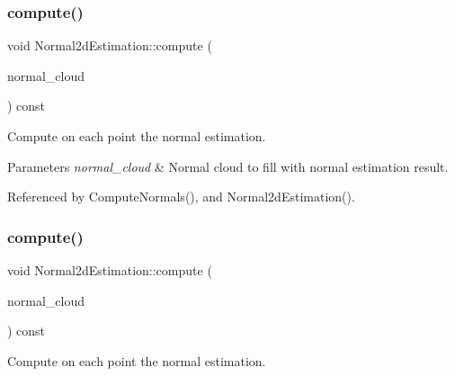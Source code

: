 \mbox{\label{classNormal2dEstimation_a908d3a85cda5b29bb3ef119ab30d6ab6}} 
\subsubsection{\texorpdfstring{compute()}{compute()}\hspace{0.1cm}{\footnotesize\ttfamily [2/4]}}
{\footnotesize\ttfamily void Normal2d\+Estimation\+::compute (\begin{DoxyParamCaption}\item[{const \hyperlink{Normal2dEstimation_8h_a2894055ff89c63cbae90e22dfddaa610}{Ptr\+Cloud} \&}]{normal\+\_\+cloud }\end{DoxyParamCaption}) const}



Compute on each point the normal estimation. 


\begin{DoxyParams}{Parameters}
{\em normal\+\_\+cloud} & Normal cloud to fill with normal estimation result. \\
\hline
\end{DoxyParams}


Referenced by Compute\+Normals(), and Normal2d\+Estimation().

\mbox{\label{classNormal2dEstimation_ac3fd17679a20a7f4faab72f58fdc6199}} 
\subsubsection{\texorpdfstring{compute()}{compute()}\hspace{0.1cm}{\footnotesize\ttfamily [3/4]}}
{\footnotesize\ttfamily void Normal2d\+Estimation\+::compute (\begin{DoxyParamCaption}\item[{const \hyperlink{test0426_8cc_a6c737bbce051bc4690e4c608adc2deec}{pcl\+::\+Point\+Cloud}$<$ pcl\+::\+Normal $>$\+::Ptr \&}]{normal\+\_\+cloud }\end{DoxyParamCaption}) const}



Compute on each point the normal estimation. 


